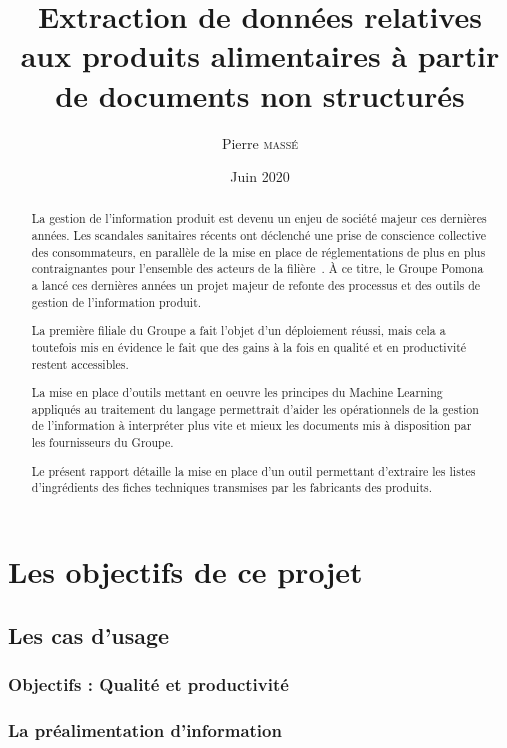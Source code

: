 \documentclass{report}
\title{Extraction de données relatives aux produits alimentaires à partir de documents non structurés}
\author{Pierre \textsc{massé}}
\date{Juin 2020}
\begin{document}
\maketitle

\large
\begin{abstract}
    {\em
    
    La gestion de l'information produit est devenu un enjeu de société majeur ces dernières années.
    Les scandales sanitaires récents ont déclenché une prise de conscience collective des consommateurs, en parallèle de la mise en place de réglementations de plus en plus contraignantes pour l'ensemble des acteurs de la filière~\cite{incotext}\cite{incoexpl}.
    \`{A} ce titre, le Groupe Pomona a lancé ces dernières années un projet majeur de refonte des processus et des outils de gestion de l'information produit.

    La première filiale du Groupe a fait l'objet d'un déploiement réussi, mais cela a toutefois mis en évidence le fait que des gains à la fois en qualité et en productivité restent accessibles.

    La mise en place d'outils mettant en oeuvre les principes du Machine Learning appliqués au traitement du langage permettrait d'aider les opérationnels de la gestion de l'information à interpréter plus vite et mieux les documents mis à disposition par les fournisseurs du Groupe.

    Le présent rapport détaille la mise en place d'un outil permettant d'extraire les listes d'ingrédients des fiches techniques transmises par les fabricants des produits.
    }
\end{abstract}
\normalsize

\tableofcontents





\part{Les objectifs de ce projet}
    \chapter{Les cas d'usage}
        \section{Objectifs : Qualité et productivité}
        \section{La préalimentation d'information}
\end{document}
